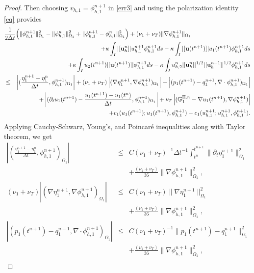 \documentclass[10pt]{article}%
\numberwithin{equation}{section}
\newcommand{\abs}[1]{\left\vert#1\right\vert}
\begin{document}
\begin{proof}
	Then choosing $v_{h,1}=\phi_{h,1}^{n+1}$ in \eqref{err3} and using the polarization identity \eqref{eq} provides
	\begin{eqnarray}
	\lefteqn{\frac{1}{2\Delta t}\Big(\|\phi_{h,1}^{n+1}\|^2_{\Omega_1}-\|\phi_{h,1}^{n}\|^2_{\Omega_1}+\|\phi_{h,1}^{n+1}-\phi_{h,1}^{n}\|^2_{\Omega_1}\Big) +(\nu_1+\nu_T)\|\nabla  \phi_{h,1}^{n+1}\|_{\Omega_1}}
		\nonumber\\
		&&+\kappa \int_{I}|[{\bf u}_h^n]|u_{h,1}^{n+1}\phi_{h,1}^{n+1}ds- \kappa\int_{I}|[{\bf u}(t^{n+1})]|u_1(t^{n+1})\phi_{h,1}^{n+1}ds\nonumber\\&&+\kappa  \int_{I}u_{2}(t^{n+1})|[{\bf u}(t^{n+1})]|\phi_{h,1}^{n+1}ds- \kappa\int_{I}u_{h,2}^n|[{\bf u}_h^n]|^{1/2}|[{\bf u}_h^{n-1}]|^{1/2}\phi_{h,1}^{n+1}ds
	\nonumber\\&\leq&\abs{(\frac{\eta_{1}^{n+1}-\eta_{1}^{n}}{\Delta t} ,\phi_{h,1}^{n+1})_{\Omega_1}}+(\nu_1+\nu_T)\abs{(\nabla  \eta_{1}^{n+1},\nabla \phi_{h,1}^{n+1})_{\Omega_1}}+\abs{(p_1(t^{n+1})-q_1^{n+1},\nabla\cdot \phi_{h,1}^{n+1})_{\Omega_1}}\nonumber\\&&+\abs{(\partial_{t}u_1(t^{n+1})-\frac{{u_1(t^{n+1})}-u_{1}(t^{n})}{\Delta t} ,\phi_{h,1}^{n+1})_{\Omega_1}}+\nu_T\abs{(\mathbb{G}_1^{\mathbb{H},n}-\nabla u_1(t^{n+1}),\nabla \phi_{h,1}^{n+1})}\nonumber\\&&+{c_1(u_{1}(t^{n+1});u_{1}(t^{n+1}),\phi_{h,1}^{n+1})}-{c_1(u_{h,1}^{n+1};u_{h,1}^{n+1},\phi_{h,1}^{n+1})}. \label{er3}
	\end{eqnarray}
	Applying Cauchy-Schwarz, Young's, and Poincar\'e inequalities along with Taylor theorem, we get
	\begin{eqnarray}
	\abs{(\frac{\eta_{1}^{n+1}-\eta_{1}^{n}}{\Delta t} ,\phi_{h,1}^{n+1})_{\Omega_1}}&\leq&C{ (\nu_1+\nu_T)}^{-1}{\Delta t}^{-1}\int_{t^n}^{t^{n+1}}\|\partial_t\eta_{1}^{n+1}\|_{\Omega_1}^2\nonumber\\&&+\frac{{ (\nu_1+\nu_T)}}{36}\|\nabla \phi_{h,1}^{n+1}\|_{\Omega_1}^2, \label{err0}\\
	(\nu_1+\nu_T)\abs{(\nabla  \eta_{1}^{n+1},\nabla \phi_{h,1}^{n+1})_{\Omega_1}}&\leq&C{ (\nu_1+\nu_T)}\|\nabla \eta_1^{n+1}\|_{\Omega_1}^2\nonumber\\&&+\frac{{ (\nu_1+\nu_T)}}{36}\|\nabla \phi_{h,1}^{n+1}\|_{\Omega_1}^2,\\
	\abs{(p_1(t^{n+1})-q_1^{n+1},\nabla\cdot \phi_{h,1}^{n+1})_{\Omega_1}}&\leq&C{ (\nu_1+\nu_T)}^{-1}\|p_1(t^{n+1})-q_1^{n+1}\|_{\Omega_1}^2\nonumber\\&&+\frac{{ (\nu_1+\nu_T)}}{36}\|\nabla \phi_{h,1}^{n+1}\|_{\Omega_1}^2,\\

\end{eqnarray}
\end{proof}
\end{document}
